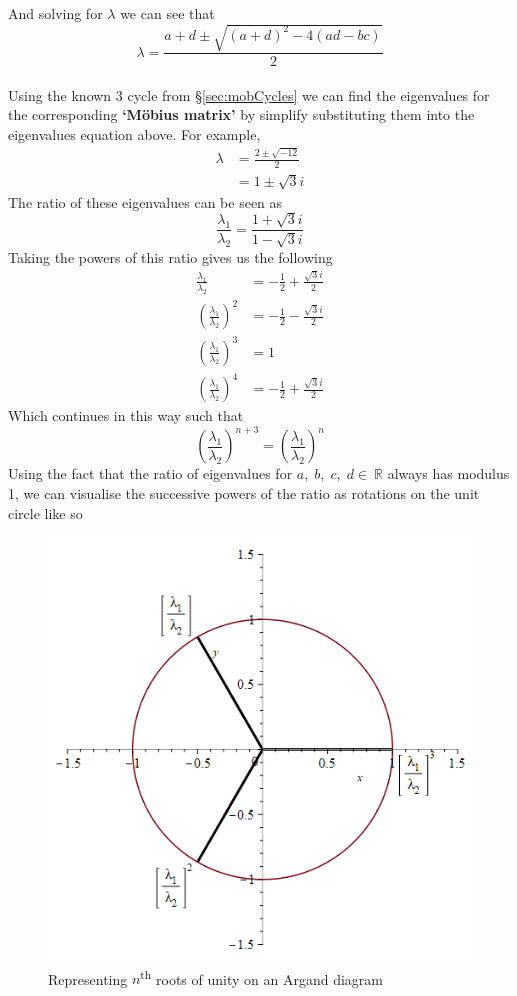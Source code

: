 \documentclass[12pt]{article}
\begin{document}
And solving for $\lambda$ we can see that
	\[\lambda=\frac{a+d\pm\sqrt{(a+d)^2-4(ad-bc)}}{2}\]
\\ \noindent Using the known 3 cycle from \S\ref{sec:mobCycles} we can find the eigenvalues for the corresponding \textbf{`Möbius matrix'} by simplify substituting them into the eigenvalues equation above. For example, 
	\begin{equation*}
		\begin{split}
			\lambda & =\frac{2\pm\sqrt{-12}}{2} \\
			        & =1\pm\sqrt{3}i
		\end{split}
	\end{equation*}
The ratio of these eigenvalues can be seen as 
	\[\frac{\lambda_1}{\lambda_2}=\frac{1+\sqrt{3}i}{1-\sqrt{3}i}\]
Taking the powers of this ratio gives us the following
	\begin{equation*}
		\begin{split}
			\frac{\lambda_1}{\lambda_2}                & =-\frac{1}{2}+\frac{\sqrt{3}i}{2} \\[10pt]
			\left(\frac{\lambda_1}{\lambda_2}\right)^2 & =-\frac{1}{2}-\frac{\sqrt{3}i}{2} \\[10pt]
			\left(\frac{\lambda_1}{\lambda_2}\right)^3 & =1                                \\[10pt]
			\left(\frac{\lambda_1}{\lambda_2}\right)^4 & =-\frac{1}{2}+\frac{\sqrt{3}i}{2}
		\end{split}
	\end{equation*}
Which continues in this way such that
	\[\left(\frac{\lambda_1}{\lambda_2}\right)^{n+3}=\left(\frac{\lambda_1}{\lambda_2}\right)^n\]
Using the fact that the ratio of eigenvalues for $a,\;b,\;c,\;d\in\ \mathbb{R}$ always has modulus 1, we can visualise the successive powers of the ratio as rotations on the unit circle like so
	\begin{figure}[H]
		\centerline{\includegraphics[scale=0.4]{eigenCycle.png}}
		\caption{Representing $n$\textsuperscript{th} roots of unity on an Argand diagram}
	\label{fig:eigenCycle}
	\end{figure}
\end{document}
